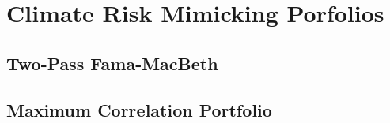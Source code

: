 \chapter{Climate Risk Mimicking Porfolios}
 
\section{Two-Pass Fama-MacBeth}


\section{Maximum Correlation Portfolio}